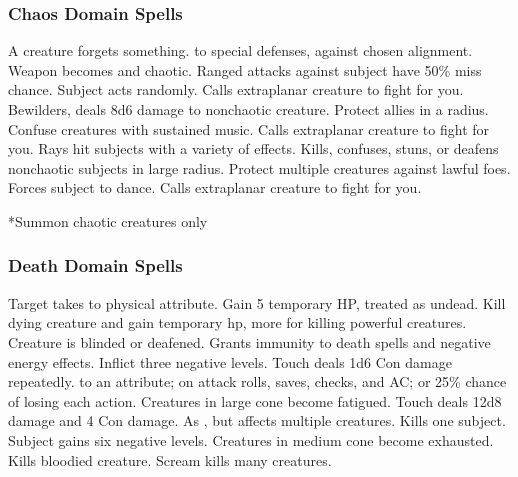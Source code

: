\subsubsection{Chaos Domain Spells}

\begin{spelllist}
     A creature forgets something.
      to special defenses,  against chosen alignment.
     Weapon becomes  and chaotic.
     Ranged attacks against subject have 50\% miss chance.
     Subject acts randomly.
     Calls extraplanar creature to fight for you.
     Bewilders, deals 8d6 damage to nonchaotic creature.
     Protect allies in a \areamed radius.
     Confuse creatures with sustained music.
     Calls extraplanar creature to fight for you.
     Rays hit subjects with a variety of effects.
     Kills, confuses, stuns, or deafens nonchaotic subjects in large radius.
    \F Protect multiple creatures against lawful foes. 
    \spellhead[8]{}
     Forces subject to dance.
     Calls extraplanar creature to fight for you.
\end{spelllist}
*Summon chaotic creatures only

\subsubsection{Death Domain Spells}

\begin{spelllist}
     Target takes  to physical attribute.
     Gain 5 temporary HP, treated as undead.
     Kill dying creature and gain temporary hp, more for killing powerful creatures.
     Creature is blinded or deafened.
     Grants immunity to death spells and negative energy effects.
    \spellhead[3]{}
     Inflict three negative levels.
     Touch deals 1d6 Con damage repeatedly.
      to an attribute;  on attack rolls, saves, checks, and AC; or 25\% chance of losing each action.
     Creatures in large cone become fatigued.
    \spellhead[6]{}
     Touch deals 12d8 damage and 4 Con damage.
     As , but affects multiple creatures.
     Kills one subject.
     Subject gains six negative levels.
     Creatures in medium cone become exhausted.
     Kills bloodied creature.
     Scream kills many creatures. 
\end{spelllist}

